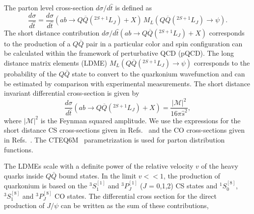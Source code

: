 \documentclass[12pt,a4paper,final]{iopart}
\newcommand{\barQ}{{\bar{Q}}}
\begin{document}
 The parton level cross-section $d\sigma/d\hat{t}$ is defined as~\cite{Bodwin:1994jh}
\begin{equation}
\frac{d\sigma}{d\hat t} = \frac{d\sigma}{d\hat t}(ab\rightarrow Q\overline{Q}(^{2S+1}L_{J})+X)
               \, M_{L}(Q\overline{Q}(^{2S+1}L_{J})\rightarrow\psi).
\end{equation}
  The short distance contribution 
$d\sigma/d\hat t (ab\rightarrow Q\overline{Q}(^{2S+1}L_{J})+X)$ 
corresponds to the production of a $Q\barQ$ pair in a particular
color and spin configuration can be calculated within the framework of 
perturbative QCD (pQCD). The long distance matrix elements (LDME) 
$M_{L}(Q\overline{Q}(^{2S+1}L_{J})\rightarrow\psi)$ corresponds to the 
probability of the $Q\barQ$ state to convert to the quarkonium wavefunction
and can be estimated by comparison with experimental measurements. 
 The short distance invariant differential cross-section is given by
\begin{equation}
  \frac{d\sigma}{d\hat t}(ab\rightarrow Q\overline{Q}(^{2S+1}L_{J})+X) 
                = \frac{|\mathcal{M}|^2}{16\pi{\hat s}^2},
\end{equation}
where $|\mathcal{M}|^2$ is the Feynman squared amplitude. We use the expressions for the 
short distance CS cross-sections given in 
Refs.~\cite{Baier:1983va,Humpert:1986cy,Gastmans:1987be} and the CO 
cross-sections given in Refs.~\cite{Cho:1995vh,Cho:1995ce,Braaten:2000cm}. 
  The CTEQ6M~\cite{Lai:2010vv} parametrization is used for parton 
distribution functions. 

   The LDMEs scale with a definite power of the relative velocity $v$ of the 
heavy quarks inside $Q\bar Q$ bound states. In the limit $v<<1$, the production of 
quarkonium is based on the $^3S_1^{[1]}$ and $^3P_J^{[1]}$ ($J$ = 0,1,2) CS states 
and $^1S_0^{[8]}$, $^3S_1^{[8]}$ and $^3P_J^{[8]}$ CO states. The differential 
cross section for the direct production of $J/\psi$ can be written as the 
sum of these contributions,

\end{document}
